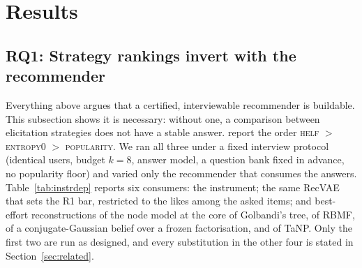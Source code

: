 \documentclass[manuscript,screen,review]{acmart}
\begin{document}
\section{Results}\label{sec:results}

\subsection{RQ1: Strategy rankings invert with the recommender}\label{sec:res:inversion}

Everything above argues that a certified, interviewable recommender is buildable. This subsection shows it is necessary: without one, a comparison between elicitation strategies does not have a stable answer. \citet{rashid2008learning} report the order \textsc{helf} $>$ \textsc{entropy0} $>$ \textsc{popularity}. We ran all three under a fixed interview protocol (identical users, budget $k{=}8$, answer model, a question bank fixed in advance, no popularity floor) and varied only the recommender that consumes the answers. Table~\ref{tab:instrdep} reports six consumers: the instrument; the same RecVAE that sets the R1 bar, restricted to the likes among the asked items; and best-effort reconstructions of the node model at the core of Golbandi's tree, of RBMF, of a conjugate-Gaussian belief over a frozen factorisation, and of TaNP. Only the first two are run as designed, and every substitution in the other four is stated in Section~\ref{sec:related}.
\end{document}
